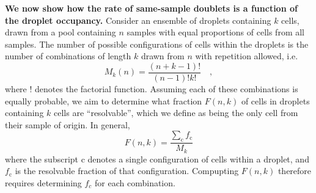 \documentclass[unnumsec,webpdf,modern,large]{oup-authoring-template}
\begin{document}
	\textbf{We now show how the rate of same-sample doublets is a function of the droplet occupancy.}
	Consider an ensemble of droplets containing $k$ cells, drawn from a pool containing $n$ samples with equal proportions of cells from all samples. 
	The number of possible configurations of cells within the droplets is the number of combinations of length $k$ drawn from $n$ with repetition allowed, i.e. 
	\begin{equation}
		M_k(n) = \frac{(n + k - 1)!}{(n - 1)! k!} \quad ,
		\label{eq:multiplet_configurations}
	\end{equation}
	where $!$ denotes the factorial function. 
	Assuming each of these combinations is equally probable, we aim to determine what fraction $F(n, k)$ of cells in droplets containing $k$ cells are ``resolvable'', which we define as being the only cell from their sample of origin.
	In general, 
	\begin{equation}
		F(n, k) = \frac{\sum_{\mathrm c} f_{\mathrm c}}{M_k}
		\label{eq:resolvable_fraction_given_k}
	\end{equation}
	where the subscript $\mathrm{c}$ denotes a single configuration of cells within a droplet, and $f_{\mathrm c}$ is the resolvable fraction of that configuration. 
	Compupting $F(n, k)$ therefore requires determining $f_c$ for each combination. 
	
\end{document}
